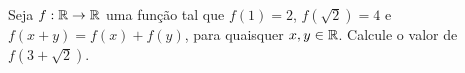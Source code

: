 \item
Seja $f : {\mathbb R} \to {\mathbb R}$ uma função tal que $f (1) = 2$, $f (\sqrt 2) = 4$ e $f (x + y) = f (x) + f (y)$, para
quaisquer $x, y \in {\mathbb R}$. Calcule o valor de $f (3 + \sqrt{2})$.
